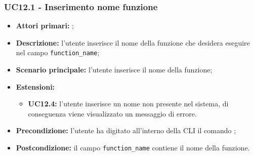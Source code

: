 \subsubsection{UC12.1 - Inserimento nome funzione}
\begin{itemize}
	\item \textbf{Attori primari:} \ua{};
	\item \textbf{Descrizione:} l’utente inserisce il nome della funzione che desidera eseguire nel campo \texttt{function\_name};
	\item \textbf{Scenario principale:} l'utente inserisce il nome della funzione; 
	\item \textbf{Estensioni:} 
	\begin{itemize}
		\item \textbf{UC12.4:} l’utente inserisce un nome non presente nel sistema, di conseguenza viene visualizzato un messaggio di errore.
	\end{itemize}
	\item \textbf{Precondizione:} l’utente ha digitato all’interno della CLI il comando \run{};
	\item \textbf{Postcondizione:}  il campo \texttt{function\_name} contiene il nome della funzione.
\end{itemize}